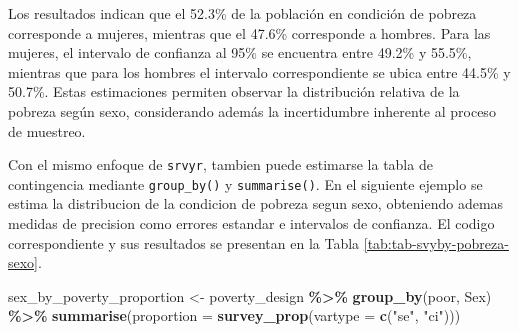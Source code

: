 \documentclass[
  spanish,
  12pt,
]{book}
\newenvironment{Shaded}{\begin{snugshade}}{\end{snugshade}}
\newcommand{\AttributeTok}[1]{\textcolor[rgb]{0.13,0.29,0.53}{#1}}
\newcommand{\FunctionTok}[1]{\textcolor[rgb]{0.13,0.29,0.53}{\textbf{#1}}}
\newcommand{\NormalTok}[1]{#1}
\newcommand{\OtherTok}[1]{\textcolor[rgb]{0.56,0.35,0.01}{#1}}
\newcommand{\SpecialCharTok}[1]{\textcolor[rgb]{0.81,0.36,0.00}{\textbf{#1}}}
\newcommand{\StringTok}[1]{\textcolor[rgb]{0.31,0.60,0.02}{#1}}
\begin{document}
Los resultados indican que el 52.3\% de la población en condición de pobreza corresponde a mujeres, mientras que el 47.6\% corresponde a hombres. Para las mujeres, el intervalo de confianza al 95\% se encuentra entre 49.2\% y 55.5\%, mientras que para los hombres el intervalo correspondiente se ubica entre 44.5\% y 50.7\%. Estas estimaciones permiten observar la distribución relativa de la pobreza según sexo, considerando además la incertidumbre inherente al proceso de muestreo.

Con el mismo enfoque de \texttt{srvyr}, tambien puede estimarse la tabla de contingencia mediante \texttt{group\_by()} y \texttt{summarise()}. En el siguiente ejemplo se estima la distribucion de la condicion de pobreza segun sexo, obteniendo ademas medidas de precision como errores estandar e intervalos de confianza. El codigo correspondiente y sus resultados se presentan en la Tabla \ref{tab:tab-svyby-pobreza-sexo}.

\begin{Shaded}
\begin{Highlighting}[]
\NormalTok{sex\_by\_poverty\_proportion }\OtherTok{\textless{}{-}}\NormalTok{ poverty\_design }\SpecialCharTok{\%\textgreater{}\%}
  \FunctionTok{group\_by}\NormalTok{(poor, Sex) }\SpecialCharTok{\%\textgreater{}\%}
  \FunctionTok{summarise}\NormalTok{(}\AttributeTok{proportion =} \FunctionTok{survey\_prop}\NormalTok{(}\AttributeTok{vartype =} \FunctionTok{c}\NormalTok{(}\StringTok{"se"}\NormalTok{, }\StringTok{"ci"}\NormalTok{)))}
\end{Highlighting}
\end{Shaded}
\end{document}
